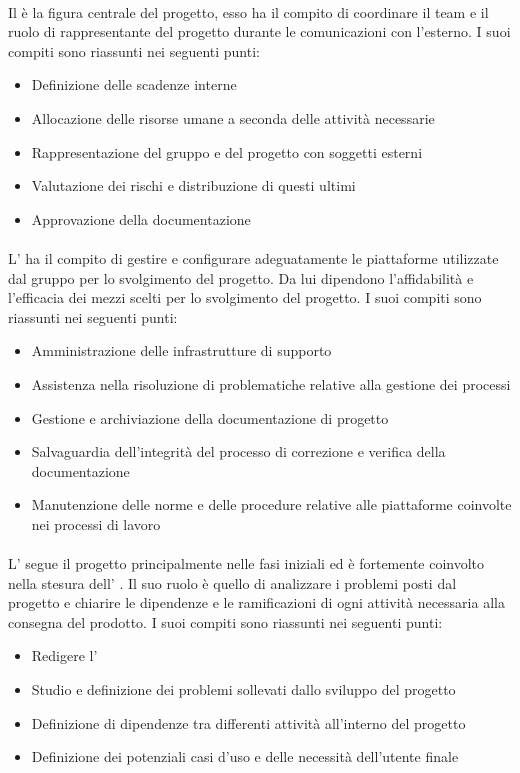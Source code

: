 \paragraph{\RdP{}}
Il \RdP{} è la figura centrale del progetto, esso ha il compito di coordinare il team e il ruolo di rappresentante del progetto durante le comunicazioni con l'esterno. I suoi compiti sono riassunti nei seguenti punti:
\begin{itemize}
\item Definizione delle scadenze interne
\item Allocazione delle risorse umane a seconda delle attività necessarie
\item Rappresentazione del gruppo e del progetto con soggetti esterni
\item Valutazione dei rischi e distribuzione di questi ultimi
\item Approvazione della documentazione
\end{itemize}

\paragraph{\adm{}}
L'\adm{} ha il compito di gestire e configurare adeguatamente le piattaforme utilizzate dal gruppo per lo svolgimento del progetto. Da lui dipendono l'affidabilità e l'efficacia dei mezzi scelti per lo svolgimento del progetto.
I suoi compiti sono riassunti nei seguenti punti:
\begin{itemize}
\item Amministrazione delle infrastrutture di supporto
\item Assistenza nella risoluzione di problematiche relative alla gestione dei processi
\item Gestione e archiviazione della documentazione di progetto
\item Salvaguardia dell'integrità del processo di correzione e verifica della documentazione
\item Manutenzione delle norme e delle procedure relative alle piattaforme coinvolte nei processi di lavoro
\end{itemize}

\paragraph{\ana{}}
L' \ana{} segue il progetto principalmente nelle fasi iniziali ed è fortemente coinvolto nella stesura dell' \AdR{}. Il suo ruolo è quello di analizzare i problemi posti dal progetto e chiarire le dipendenze e le ramificazioni di ogni attività necessaria alla consegna del prodotto.
I suoi compiti sono riassunti nei seguenti punti:
\begin{itemize}
\item Redigere l'\AdR{}
\item Studio e definizione dei problemi sollevati dallo sviluppo del progetto
\item Definizione di dipendenze tra differenti attività all'interno del progetto
\item Definizione dei potenziali casi d'uso e delle necessità dell'utente finale
\end{itemize}

